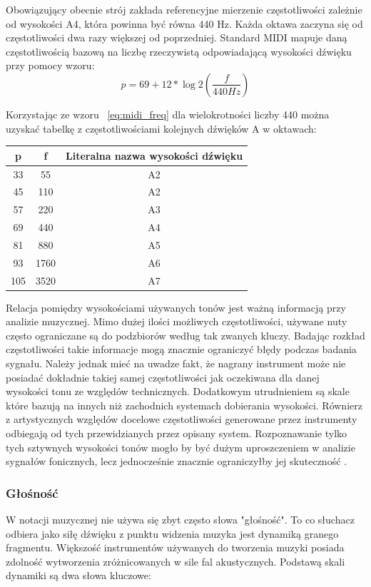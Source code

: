 \documentclass[12pt,a4paper,twoside]{mwart}
\begin{document}
Obowiązujący obecnie strój zakłada referencyjne mierzenie częstotliwości zależnie od wysokości A4, która powinna być równa 440 Hz. Każda oktawa zaczyna się od częstotliwości dwa razy większej od poprzedniej. Standard MIDI\cite[67-71]{Homerecording:LevelUp} mapuje daną częstotliwością bazową na liczbę rzeczywistą odpowiadającą wysokości dźwięku przy pomocy wzoru:
\begin{equation} \label{eq:midi_freq}
p = 69 + 12 * \log{2}(\frac{f}{440 Hz})
\end{equation}

Korzystając ze wzoru ~\ref{eq:midi_freq} dla wielokrotności liczby 440 można uzyskać tabelkę z częstotliwościami kolejnych dźwięków A w oktawach:

\begin{center}
  \begin{tabular}{ |c|c|c| } 
   \hline
   p & f & Literalna nazwa wysokości dźwięku\\
   \hline
   33 & 55 & A2\\
   45 & 110 & A2\\
   57 & 220 & A3\\
   69 & 440 & A4\\
   81 & 880 & A5\\
   93 & 1760 & A6\\
   105 & 3520 & A7\\
   \hline
  \end{tabular}
\end{center}

Relacja pomiędzy wysokościami używanych tonów jest ważną informacją przy analizie muzycznej. Mimo dużej ilości możliwych częstotliwości, używane nuty często ograniczane są do podzbiorów według tak zwanych kluczy. Badając rozkład częstotliwości takie informacje mogą znacznie ograniczyć błędy podczas badania sygnału. Należy jednak mieć na uwadze fakt, że nagrany instrument może nie posiadać dokładnie takiej samej częstotliwości jak oczekiwana dla danej wysokości tonu ze względów technicznych. Dodatkowym utrudnieniem są skale które bazują na innych niż zachodnich systemach dobierania wysokości. Równierz z artystycznych względów docelowe częstotliwości generowane przez instrumenty odbiegają od tych przewidzianych przez opisany system. Rozpoznawanie tylko tych sztywnych wysokości tonów mogło by być dużym uproszczeniem w analizie sygnałów fonicznych, lecz jednocześnie znacznie ograniczyłby jej skuteczność \cite[64-65]{Homerecording:DlaKazdego}.

\subsubsection{Głośność}
W notacji muzycznej nie używa się zbyt często słowa "głośność". To co słuchacz odbiera jako siłę dźwięku z punktu widzenia muzyka jest dynamiką granego fragmentu. Większość instrumentów używanych do tworzenia muzyki posiada zdolność wytworzenia zróżnicowanych w sile fal akustycznych. Podstawą skali dynamiki są dwa słowa kluczowe:
\end{document}
